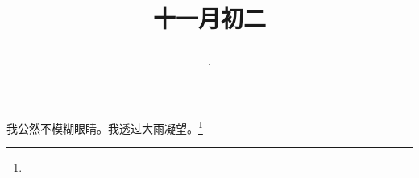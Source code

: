 \title{\date[d=2,m=12,y=2024][year:cn-y,年,month:cn,day:cn,日,·,weekday]·十一月初二 }
我公然不模糊眼睛。我透过大雨凝望。\footnote{ }

